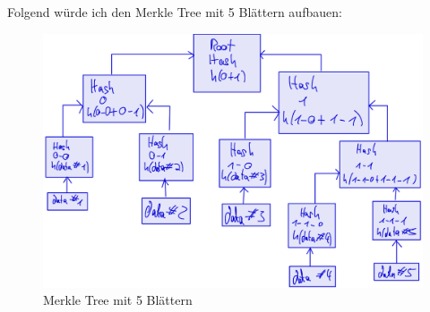 \documentclass[german]{../uebung}
\begin{document}
\begin{exercise}{5}
    Folgend würde ich den Merkle Tree mit 5 Blättern aufbauen:
    \begin{figure}[h]
        \centering
        \includegraphics*[scale=.5]{MerkleTree.png}
        \caption{Merkle Tree mit 5 Blättern}
    \end{figure}\\
\end{exercise}
\end{document}

